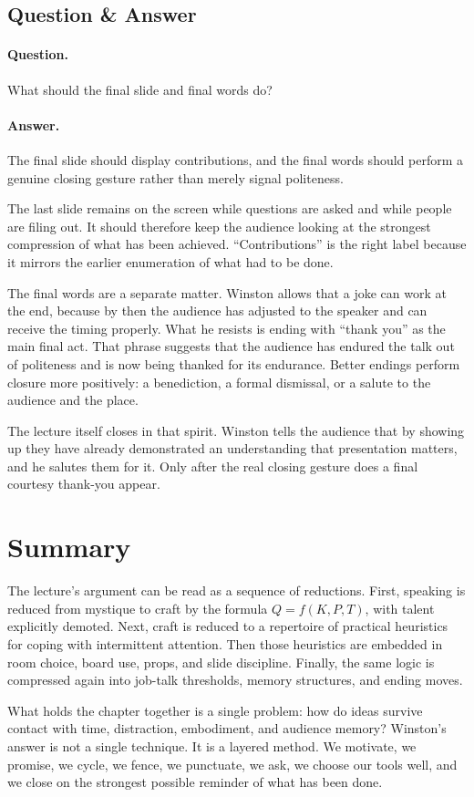 \subsection{Question \& Answer}

\paragraph{Question.} What should the final slide and final words do?

\paragraph{Answer.} The final slide should display contributions, and the final words should perform a genuine closing gesture rather than merely signal politeness.

The last slide remains on the screen while questions are asked and while people are filing out. It should therefore keep the audience looking at the strongest compression of what has been achieved. ``Contributions'' is the right label because it mirrors the earlier enumeration of what had to be done.

The final words are a separate matter. Winston allows that a joke can work at the end, because by then the audience has adjusted to the speaker and can receive the timing properly. What he resists is ending with ``thank you'' as the main final act. That phrase suggests that the audience has endured the talk out of politeness and is now being thanked for its endurance. Better endings perform closure more positively: a benediction, a formal dismissal, or a salute to the audience and the place.

The lecture itself closes in that spirit. Winston tells the audience that by showing up they have already demonstrated an understanding that presentation matters, and he salutes them for it. Only after the real closing gesture does a final courtesy thank-you appear.

\section{Summary}

The lecture's argument can be read as a sequence of reductions. First, speaking is reduced from mystique to craft by the formula \(Q=f(K,P,T)\), with talent explicitly demoted. Next, craft is reduced to a repertoire of practical heuristics for coping with intermittent attention. Then those heuristics are embedded in room choice, board use, props, and slide discipline. Finally, the same logic is compressed again into job-talk thresholds, memory structures, and ending moves.

What holds the chapter together is a single problem: how do ideas survive contact with time, distraction, embodiment, and audience memory? Winston's answer is not a single technique. It is a layered method. We motivate, we promise, we cycle, we fence, we punctuate, we ask, we choose our tools well, and we close on the strongest possible reminder of what has been done.